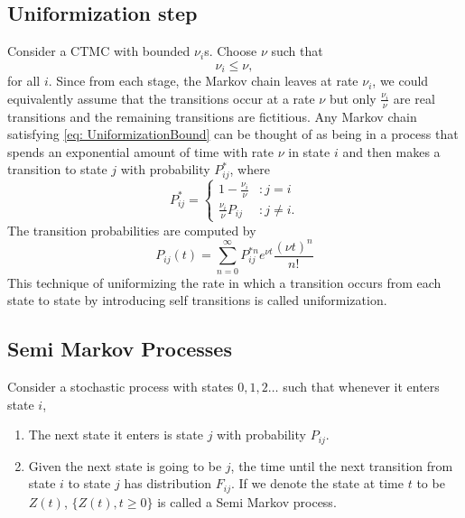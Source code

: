 \documentclass[a4paper,10pt,english]{article}
\begin{document}
\subsection{Uniformization step}
Consider a CTMC with bounded $\nu_i$s. Choose $\nu$ such that 
\begin{equation}
\label{eq: UniformizationBound}
\nu_i \leq \nu,
\end{equation}
for all $i$. Since from each stage, the Markov chain leaves at rate $\nu_i$, we could equivalently assume that the transitions occur at a rate $\nu$ but only $\frac{\nu_i}{\nu}$ are real transitions and the remaining transitions are fictitious. Any Markov chain satisfying \eqref{eq: UniformizationBound} can be thought of as being in a process that spends an exponential amount of time with rate $\nu$ in state $i$ and then makes a transition to state $j$ with probability $P_{ij}^*$, where
\begin{equation}
P_{ij}^* = \left\{
     \begin{array}{lr}
       1-\frac{\nu_i}{\nu} & : j =i\\
       \frac{\nu_i}{\nu}P_{ij} & : j \neq i.
     \end{array}
   \right.
\end{equation}   
The transition probabilities are computed by 
\begin{equation*}
P_{ij}(t)=\sum_{n=0}^{\infty}P_{ij}^{*n}e^{\nu t} \frac{{(\nu t)}^n}{n!}
\end{equation*}
This technique of uniformizing the rate in which a transition occurs from each state to state by introducing self transitions is called uniformization.





\subsection{Semi Markov Processes}
Consider a stochastic process with states $0,1,2 \hdots$ such that whenever it enters state $i$,
\begin{enumerate}
\item {The next state it enters is state $j$ with probability $P_{ij}$.}\\
\item {Given the next state is going to be $j$, the time until the next transition from state $i$ to state $j$ has distribution $F_{ij}$. If we denote the state at time $t$ to be $Z(t)$, $\{Z(t), t \geq 0\}$ is called a Semi Markov process.}
\end{enumerate}
\end{document}
